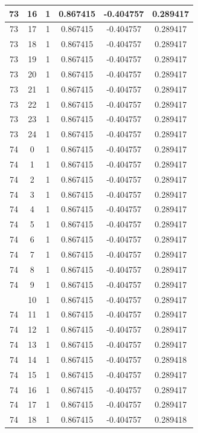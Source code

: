\documentclass[12pt,a4paper]{article}
\numberwithin{equation}{section}
\numberwithin{figure}{section}
\numberwithin{table}{section}
\begin{document}
\begin{longtable}{|c|c|c|c|c|c|}
73 & 16 & 1 & 0.867415 & -0.404757 & 0.289417 \\ \hline
73 & 17 & 1 & 0.867415 & -0.404757 & 0.289417 \\ \hline
73 & 18 & 1 & 0.867415 & -0.404757 & 0.289417 \\ \hline
73 & 19 & 1 & 0.867415 & -0.404757 & 0.289417 \\ \hline
73 & 20 & 1 & 0.867415 & -0.404757 & 0.289417 \\ \hline
73 & 21 & 1 & 0.867415 & -0.404757 & 0.289417 \\ \hline
73 & 22 & 1 & 0.867415 & -0.404757 & 0.289417 \\ \hline
73 & 23 & 1 & 0.867415 & -0.404757 & 0.289417 \\ \hline
73 & 24 & 1 & 0.867415 & -0.404757 & 0.289417 \\ \hline
74 & 0 & 1 & 0.867415 & -0.404757 & 0.289417 \\ \hline
74 & 1 & 1 & 0.867415 & -0.404757 & 0.289417 \\ \hline
74 & 2 & 1 & 0.867415 & -0.404757 & 0.289417 \\ \hline
74 & 3 & 1 & 0.867415 & -0.404757 & 0.289417 \\ \hline
74 & 4 & 1 & 0.867415 & -0.404757 & 0.289417 \\ \hline
74 & 5 & 1 & 0.867415 & -0.404757 & 0.289417 \\ \hline
74 & 6 & 1 & 0.867415 & -0.404757 & 0.289417 \\ \hline
74 & 7 & 1 & 0.867415 & -0.404757 & 0.289417 \\ \hline
74 & 8 & 1 & 0.867415 & -0.404757 & 0.289417 \\ \hline
74 & 9 & 1 & 0.867415 & -0.404757 & 0.289417 \\ \hline
\pagebreak
74 & 10 & 1 & 0.867415 & -0.404757 & 0.289417 \\ \hline
74 & 11 & 1 & 0.867415 & -0.404757 & 0.289417 \\ \hline
74 & 12 & 1 & 0.867415 & -0.404757 & 0.289417 \\ \hline
74 & 13 & 1 & 0.867415 & -0.404757 & 0.289417 \\ \hline
74 & 14 & 1 & 0.867415 & -0.404757 & 0.289418 \\ \hline
74 & 15 & 1 & 0.867415 & -0.404757 & 0.289417 \\ \hline
74 & 16 & 1 & 0.867415 & -0.404757 & 0.289417 \\ \hline
74 & 17 & 1 & 0.867415 & -0.404757 & 0.289417 \\ \hline
74 & 18 & 1 & 0.867415 & -0.404757 & 0.289418 \\ \hline

\end{longtable}
\end{document}
